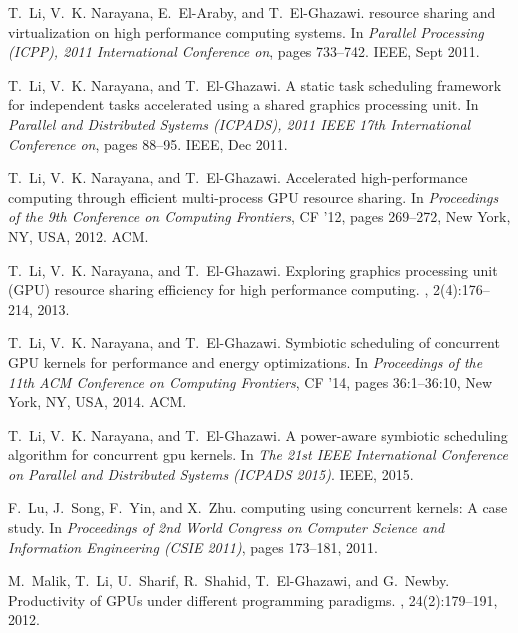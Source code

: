 \documentclass[twocolumn]{el-author}
\begin{document}
\begin{thebibliography}{10}

T.~Li, V.~K. Narayana, E.~El-Araby, and T.~El-Ghazawi.
 resource sharing and virtualization on high performance
  computing systems.
\newblock In {\em Parallel Processing (ICPP), 2011 International Conference
  on}, pages 733--742. IEEE, Sept 2011.

T.~Li, V.~K. Narayana, and T.~El-Ghazawi.
\newblock A static task scheduling framework for independent tasks accelerated
  using a shared graphics processing unit.
\newblock In {\em Parallel and Distributed Systems (ICPADS), 2011 IEEE 17th
  International Conference on}, pages 88--95. IEEE, Dec 2011.

T.~Li, V.~K. Narayana, and T.~El-Ghazawi.
\newblock Accelerated high-performance computing through efficient
  multi-process {GPU} resource sharing.
\newblock In {\em Proceedings of the 9th Conference on Computing Frontiers}, CF
  '12, pages 269--272, New York, NY, USA, 2012. ACM.

T.~Li, V.~K. Narayana, and T.~El-Ghazawi.
\newblock Exploring graphics processing unit ({GPU}) resource sharing
  efficiency for high performance computing.
, 2(4):176--214, 2013.

T.~Li, V.~K. Narayana, and T.~El-Ghazawi.
\newblock Symbiotic scheduling of concurrent {GPU} kernels for performance and
  energy optimizations.
\newblock In {\em Proceedings of the 11th ACM Conference on Computing
  Frontiers}, CF '14, pages 36:1--36:10, New York, NY, USA, 2014. ACM.

T.~Li, V.~K. Narayana, and T.~El-Ghazawi.
\newblock A power-aware symbiotic scheduling algorithm for concurrent gpu
  kernels.
\newblock In {\em The 21st IEEE International Conference on Parallel and
  Distributed Systems (ICPADS 2015)}. IEEE, 2015.

F.~Lu, J.~Song, F.~Yin, and X.~Zhu.
 computing using concurrent kernels: A case study.
\newblock In {\em Proceedings of 2nd World Congress on Computer Science and
  Information Engineering (CSIE 2011)}, pages 173--181, 2011.

M.~Malik, T.~Li, U.~Sharif, R.~Shahid, T.~El-Ghazawi, and G.~Newby.
\newblock Productivity of {GPUs} under different programming paradigms.
,
  24(2):179--191, 2012.


\end{thebibliography}
\end{document}
